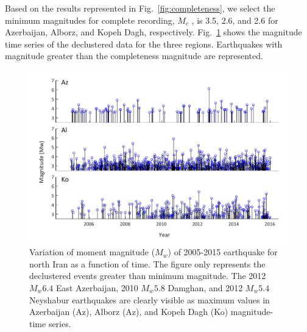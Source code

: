 Based on the results represented in Fig.~\ref{fig:completeness}, we select the minimum magnitudes for complete recording,  $M_c$ , is 3.5, 2.6, and 2.6 for Azerbaijan, Alborz, and Kopeh Dagh, respectively. Fig.~\ref{fig:mag-time}  shows the magnitude time series of the declustered data for the three regions. Earthquakes with magnitude greater than the completeness magnitude are represented. 

\begin{figure}[t]
	\centering
	\includegraphics[scale=0.8]{figures/pdf/Figure06.pdf} 
	\caption{Variation of moment magnitude ($M_w$) of 2005-2015 earthquake for north Iran as a function of time. The figure only represents the declustered events greater than minimum magnitude. The 2012 $M_w 6.4$ East Azerbaijan, 2010 $M_w 5.8$ Damghan, and 2012 $M_w 5.4$ Neyshabur earthquakes are clearly visible as maximum values in Azerbaijan (Az),  Alborz (Az), and Kopeh Dagh (Ko) magnitude-time series.}
	\label{fig:mag-time}
\end{figure}

